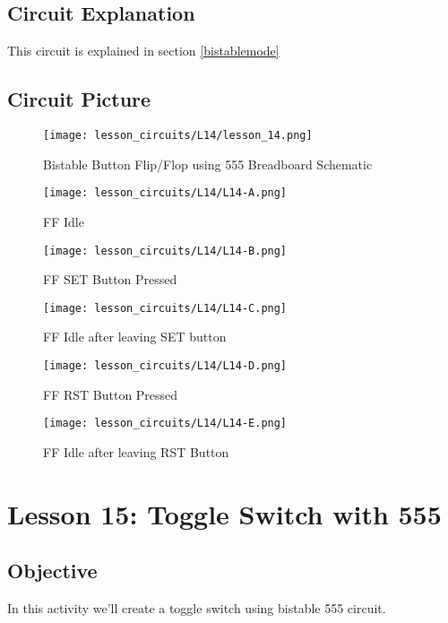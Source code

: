 \subsection{Circuit Explanation}
This circuit is explained in section \ref{bistablemode}
\subsection{Circuit Picture}
\begin{figure}[!htp]
    \centering
    \texttt{[image: lesson\_circuits/L14/lesson\_14.png]}
    \caption{Bistable Button Flip/Flop using 555 Breadboard Schematic}
    \label{fig:555_ff_sch}
\end{figure}
\begin{figure}[!htp]
    \centering
    \texttt{[image: lesson\_circuits/L14/L14-A.png]}
    \caption{FF Idle}
    \label{fig:555_ff_obb}
\end{figure}
\begin{figure}[!htp]
    \centering
    \texttt{[image: lesson\_circuits/L14/L14-B.png]}
    \caption{FF SET Button Pressed}
    \label{fig:555_ff_obb1}
\end{figure}
\begin{figure}[!htp]
    \centering
    \texttt{[image: lesson\_circuits/L14/L14-C.png]}
    \caption{FF Idle after leaving SET button}
    \label{fig:555_ff_obb2}
\end{figure}
\begin{figure}[!htp]
    \centering
    \texttt{[image: lesson\_circuits/L14/L14-D.png]}
    \caption{FF RST Button Pressed}
    \label{fig:555_ff_obb3}
\end{figure}
\begin{figure}[!htp]
    \centering
    \texttt{[image: lesson\_circuits/L14/L14-E.png]}
    \caption{FF Idle after leaving RST Button}
    \label{fig:555_ff_obb4}
\end{figure}
\clearpage
\section{Lesson 15: Toggle Switch with 555}
\subsection{Objective}
In this activity we'll create a toggle switch using bistable 555 circuit.
